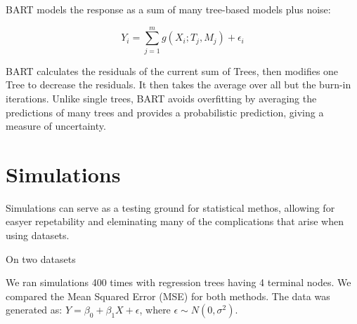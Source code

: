 \documentclass[12pt]{article}
\begin{document}
BART models the response as a sum of many tree-based models plus noise:

\begin{equation}
    Y_i = \sum_{j=1}^{m} g(X_i; T_j, M_j) + \epsilon_i
\end{equation}

BART calculates the residuals of the current sum of Trees, then modifies one Tree to decrease the residuals. It then takes the average over all but the burn-in iterations. Unlike single trees, BART avoids overfitting by averaging the predictions of many trees and provides a probabilistic prediction, giving a measure of uncertainty.








\section{Simulations}

Simulations can serve as a testing ground for statistical methos, allowing for easyer repetability and eleminating many of the complications that arise when using datasets.

On two datasets 

We ran simulations 400 times with regression trees having 4 terminal nodes. We compared the Mean Squared Error (MSE) for both methods. The data was generated as: $Y = \beta_0 + \beta_1X + \epsilon$, where $\epsilon \sim N(0, \sigma^2)$.
\end{document}
